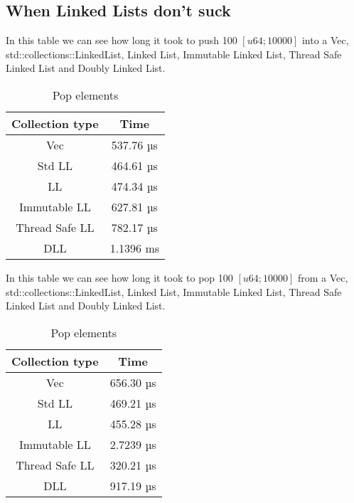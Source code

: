 \documentclass[11pt,twoside,a4paper]{article}
\begin{document}
\subsection*{When Linked Lists don't suck}

In this table we can see how long it took to push 100 $[u64; 10000]$ into a Vec,\\
std::collections::LinkedList, Linked List, Immutable Linked List, Thread Safe
Linked List and Doubly Linked List.
\begin{table}[!h]
      \begin{center}
            \caption{Pop elements}
            \begin{tabular}{|c|c|}
                  \hline
                  Collection type & Time      \\
                  \hline
                  Vec             & 537.76 µs \\
                  Std LL          & 464.61 µs \\
                  LL              & 474.34 µs \\
                  Immutable LL    & 627.81 µs \\
                  Thread Safe LL  & 782.17 µs \\
                  DLL             & 1.1396 ms \\
                  \hline
            \end{tabular}
      \end{center}
\end{table}

In this table we can see how long it took to pop 100 $[u64; 10000]$ from a Vec,\\
std::collections::LinkedList, Linked List, Immutable Linked List, Thread Safe
Linked List and Doubly Linked List.
\begin{table}[!h]
      \begin{center}
            \caption{Pop elements}
            \begin{tabular}{|c|c|}
                  \hline
                  Collection type & Time      \\
                  \hline
                  Vec             & 656.30 µs \\
                  Std LL          & 469.21 µs \\
                  LL              & 455.28 µs \\
                  Immutable LL    & 2.7239 µs \\
                  Thread Safe LL  & 320.21 µs \\
                  DLL             & 917.19 µs \\
                  \hline
            \end{tabular}
      \end{center}
\end{table}
\end{document}

